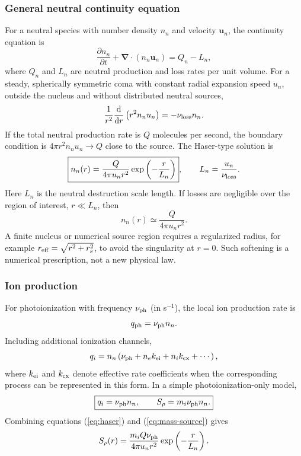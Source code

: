 \documentclass[11pt,a4paper]{article}
\newcommand{\dd}{\mathrm{d}}
\newcommand{\Div}{\boldsymbol{\nabla}\!\cdot}
\newcommand{\uvec}{\boldsymbol{u}}
\begin{document}
\subsubsection{General neutral continuity equation}
For a neutral species with number density $n_n$ and velocity $\uvec_n$, the continuity equation is
\begin{equation}
\frac{\partial n_n}{\partial t}+\Div(n_n\uvec_n)=Q_n-L_n,
\label{eq:neutral-cont-general}
\end{equation}
where $Q_n$ and $L_n$ are neutral production and loss rates per unit volume. For a steady, spherically symmetric coma with constant radial expansion speed $u_n$, outside the nucleus and without distributed neutral sources,
\begin{equation}
\frac{1}{r^2}\frac{\dd}{\dd r}\left(r^2 n_n u_n\right)=-\nu_{\rm loss}n_n.
\label{eq:neutral-radial}
\end{equation}
If the total neutral production rate is $Q$ molecules per second, the boundary condition is $4\pi r^2n_nu_n\to Q$ close to the source. The Haser-type solution is
\begin{equation}
\boxed{n_n(r)=\frac{Q}{4\pi u_n r^2}\exp\left(-\frac{r}{L_n}\right)},
\qquad L_n=\frac{u_n}{\nu_{\rm loss}}.
\label{eq:haser}
\end{equation}
Here $L_n$ is the neutral destruction scale length. If losses are negligible over the region of interest, $r\ll L_n$, then
\begin{equation}
\boxed{n_n(r)\simeq\frac{Q}{4\pi u_n r^2}.}
\label{eq:haser-simple}
\end{equation}
A finite nucleus or numerical source region requires a regularized radius, for example $r_{\rm eff}=\sqrt{r^2+r_s^2}$, to avoid the singularity at $r=0$. Such softening is a numerical prescription, not a new physical law.

\subsubsection{Ion production}
For photoionization with frequency $\nu_{\rm ph}$ (in s$^{-1}$), the local ion production rate is
\begin{equation}
q_{\rm ph}=\nu_{\rm ph}n_n.
\label{eq:photoion}
\end{equation}
Including additional ionization channels,
\begin{equation}
q_i=n_n\left(\nu_{\rm ph}+n_e k_{\rm ei}+n_i k_{\rm cx}+\cdots\right),
\label{eq:ionization-full}
\end{equation}
where $k_{\rm ei}$ and $k_{\rm cx}$ denote effective rate coefficients when the corresponding process can be represented in this form. In a simple photoionization-only model,
\begin{equation}
\boxed{q_i=\nu_{\rm ph}n_n,\qquad S_\rho=m_i\nu_{\rm ph}n_n.}
\label{eq:mass-source}
\end{equation}
Combining equations (\ref{eq:haser}) and (\ref{eq:mass-source}) gives
\begin{equation}
S_\rho(r)=\frac{m_iQ\nu_{\rm ph}}{4\pi u_n r^2}\exp\left(-\frac{r}{L_n}\right).
\label{eq:haser-source}
\end{equation}
\end{document}
